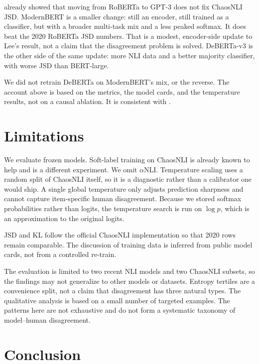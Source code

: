 \documentclass[11pt,a4paper]{article}
\begin{document}
\citet{lee2023dissenting} already showed that moving from RoBERTa to GPT-3 does not fix ChaosNLI JSD. ModernBERT is a smaller change: still an encoder, still trained as a classifier, but with a broader multi-task mix and a less peaked softmax. It does beat the 2020 RoBERTa JSD numbers. That is a modest, encoder-side update to Lee's result, not a claim that the disagreement problem is solved. DeBERTa-v3 is the other side of the same update: more NLI data and a better majority classifier, with worse JSD than BERT-large.

We did not retrain DeBERTa on ModernBERT's mix, or the reverse. The account above is based on the metrics, the model cards, and the temperature results, not on a causal ablation. It is consistent with \citep{nie2020chaosnli,meissner2021capturing,baan2022stop,pavlick2019inherent}.

\section{Limitations}

We evaluate frozen models. Soft-label training on ChaosNLI is already known to help \citep{zhou2022distributed} and is a different experiment. We omit $\alpha$NLI. Temperature scaling uses a random split of ChaosNLI itself, so it is a diagnostic rather than a calibrator one would ship. A single global temperature only adjusts prediction sharpness and cannot capture item-specific human disagreement. Because we stored softmax probabilities rather than logits, the temperature search is run on $\log p$, which is an approximation to the original logits.

JSD and KL follow the official ChaosNLI implementation so that 2020 rows remain comparable. The discussion of training data is inferred from public model cards, not from a controlled re-train.

The evaluation is limited to two recent NLI models and two ChaosNLI subsets, so the findings may not generalize to other models or datasets. Entropy tertiles are a convenience split, not a claim that disagreement has three natural types. The qualitative analysis is based on a small number of targeted examples. The patterns here are not exhaustive and do not form a systematic taxonomy of model--human disagreement.

\section{Conclusion}
\end{document}
